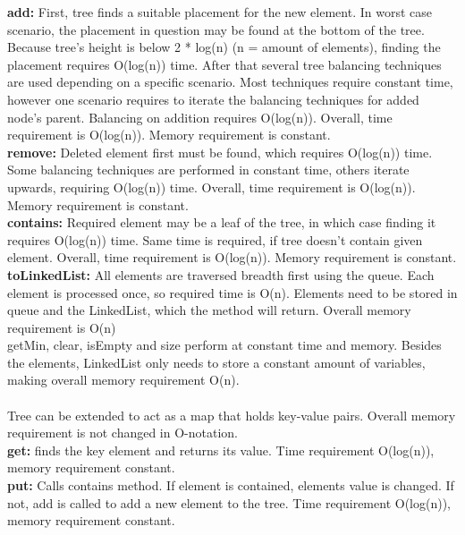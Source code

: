 \documentclass[a4paper,12pt]{article}
\begin{document}
\textbf{add:} First, tree finds a suitable placement for the new element. In worst case scenario, the placement in question may be found at the bottom of the tree. Because tree's height is below 2 * log(n) (n = amount of elements), finding the placement requires O(log(n)) time. After that several tree balancing techniques are used depending on a specific scenario. Most techniques require constant time, however one scenario requires to iterate the balancing techniques for added node's parent. Balancing on addition requires O(log(n)). Overall, time requirement is O(log(n)). Memory requirement is constant.
\\

\textbf{remove:} Deleted element first must be found, which requires O(log(n)) time. Some balancing techniques are performed in constant time, others iterate upwards, requiring O(log(n)) time.  Overall, time requirement is O(log(n)). Memory requirement is constant.
\\

\textbf{contains:} Required element may be a leaf of the tree, in which case finding it requires O(log(n)) time. Same time is required, if tree doesn't contain given element. Overall, time requirement is O(log(n)). Memory requirement is constant.
\\

\textbf{toLinkedList:} All elements are traversed breadth first using the queue. Each element is processed once, so required time is O(n). Elements need to be stored in queue and the LinkedList, which the method will return. Overall memory requirement is O(n)
\\

getMin, clear, isEmpty and size perform at constant time and memory. Besides the elements, LinkedList only needs to store a constant amount of variables, making overall memory requirement O(n).\\
\\
Tree can be extended to act as a map that holds key-value pairs. Overall memory requirement is not changed in O-notation.\\

\textbf{get:} finds the key element and returns its value. Time requirement O(log(n)), memory requirement constant.
\\

\textbf{put:} Calls contains method. If element is contained, elements value is changed. If not, add is called to add a new element to the tree. Time requirement O(log(n)), memory requirement constant.
\\
\end{document}
